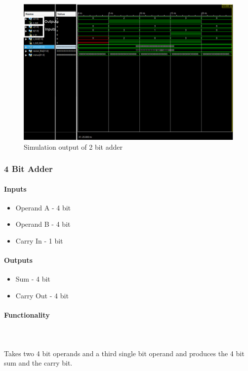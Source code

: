 \documentclass{article}
\begin{document}
    \begin{figure}[H]
        \centering
        \includegraphics[width=0.9\paperwidth,center]{Screenshots/adder_2.png}
        \caption{Simulation output of 2 bit adder}
    \end{figure}




       \subsubsection{4 Bit Adder}

       \paragraph{Inputs}
       \begin{itemize}
           \item Operand A - 4 bit
           \item Operand B - 4 bit
           \item Carry In - 1 bit
       \end{itemize}
   
       \paragraph{Outputs}
       \begin{itemize}
           \item Sum - 4 bit
           \item Carry Out - 4 bit
       \end{itemize}
   
       \paragraph{Functionality}
       \hfill\\\\
       Takes two 4 bit operands and a third single bit operand and produces the
       4 bit sum and the carry bit.
   
\end{document}
